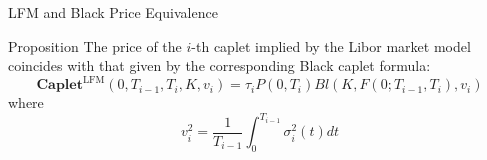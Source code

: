 \documentclass{beamer}
\begin{document}

\begin{frame}{LFM and Black Price Equivalence}
	\begin{block}{Proposition}
		The price of the $i$-th caplet implied by the Libor market model coincides with that given by the corresponding Black caplet formula:
		\begin{equation}
			\textbf{Caplet}^{\text{LFM}}(0, T_{i-1}, T_i, K, v_i)= \tau_i P(0, T_i) Bl(K, F(0; T_{i-1}, T_i), v_i)
		\end{equation}
		where
		\begin{equation}
			v_i^2 = \frac{1}{T_{i-1}}\int_0^{T_{i-1}}\sigma_i^2(t)dt
			\label{eq:caplet_black_vol}
		\end{equation}
	\end{block}
\end{frame}
\end{document}
